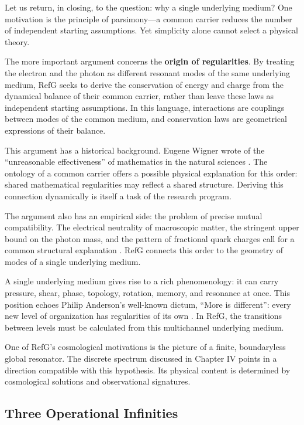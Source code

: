 \documentclass[11pt,a4paper]{article}
\begin{document}
Let us return, in closing, to the question: why a single underlying medium? One motivation is the principle of parsimony---a common carrier reduces the number of independent starting assumptions. Yet simplicity alone cannot select a physical theory.

The more important argument concerns the \textbf{origin of regularities}. By treating the electron and the photon as different resonant modes of the same underlying medium, RefG seeks to derive the conservation of energy and charge from the dynamical balance of their common carrier, rather than leave these laws as independent starting assumptions. In this language, interactions are couplings between modes of the common medium, and conservation laws are geometrical expressions of their balance.

This argument has a historical background. Eugene Wigner wrote of the ``unreasonable effectiveness'' of mathematics in the natural sciences \citep{wigner1960}. The ontology of a common carrier offers a possible physical explanation for this order: shared mathematical regularities may reflect a shared structure. Deriving this connection dynamically is itself a task of the research program.

The argument also has an empirical side: the problem of precise mutual compatibility. The electrical neutrality of macroscopic matter, the stringent upper bound on the photon mass, and the pattern of fractional quark charges call for a common structural explanation \citep{navas2024}. RefG connects this order to the geometry of modes of a single underlying medium.

A single underlying medium gives rise to a rich phenomenology: it can carry pressure, shear, phase, topology, rotation, memory, and resonance at once. This position echoes Philip Anderson's well-known dictum, ``More is different'': every new level of organization has regularities of its own \citep{anderson1972}. In RefG, the transitions between levels must be calculated from this multichannel underlying medium.

One of RefG's cosmological motivations is the picture of a finite, boundaryless global resonator. The discrete spectrum discussed in Chapter IV points in a direction compatible with this hypothesis. Its physical content is determined by cosmological solutions and observational signatures.

\subsection{Three Operational Infinities}
\end{document}
